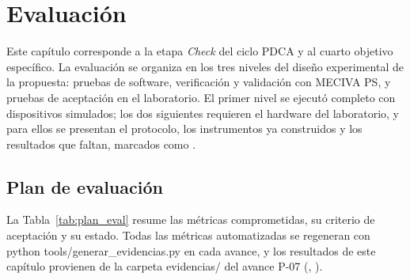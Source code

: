 \chapter{Evaluación}
\label{cap:evaluacion}

Este capítulo corresponde a la etapa \textit{Check} del ciclo PDCA y al cuarto objetivo específico. La evaluación se organiza en los tres niveles del diseño experimental de la propuesta: pruebas de software, verificación y validación con MECIVA PS, y pruebas de aceptación en el laboratorio. El primer nivel se ejecutó completo con dispositivos simulados; los dos siguientes requieren el hardware del laboratorio, y para ellos se presentan el protocolo, los instrumentos ya construidos y los resultados que faltan, marcados como .

\section{Plan de evaluación}

La Tabla~\ref{tab:plan_eval} resume las métricas comprometidas, su criterio de aceptación y su estado. Todas las métricas automatizadas se regeneran con python tools/generar\_evidencias.py en cada avance, y los resultados de este capítulo provienen de la carpeta evidencias/ del avance P-07 (\PSieteEntorno, \PSieteFecha).

